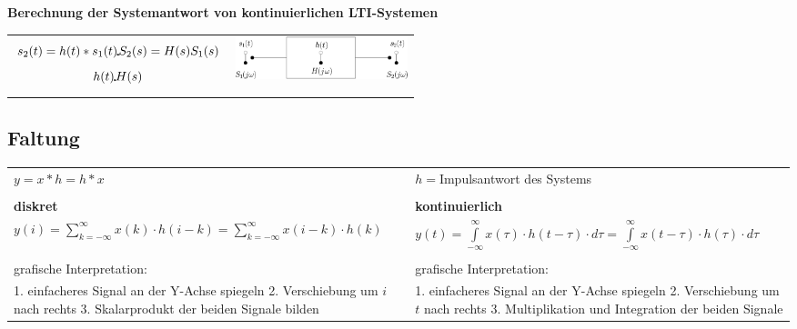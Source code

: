 		\textbf{Berechnung der Systemantwort von kontinuierlichen LTI-Systemen}\\
		\begin{tabular}{ll}
			\parbox{8cm}{
			$$s_2(t) = h(t) * s_1(t) \FT S_2(s) = H(s) S_1(s)$$
			$$h(t) \FT H(s)$$}
			& \parbox{8cm}{
			\includegraphics[width=5cm]{./bilder/utf-theorie.png}}\\
		\end{tabular}	
		
	\subsection{Faltung}
		\begin{tabular}{ll}
	        $\boxed{y=x*h=h*x}$&$h=$Impulsantwort des Systems\\ & \\
	   		\textbf{diskret}& \textbf{kontinuierlich}\\
	   		$\boxed{y(i)=\sum\limits_{k=-\infty}^{\infty}x(k)\cdot
	   		h(i-k)=\sum\limits_{k=-\infty}^{\infty}x(i-k)\cdot h(k)}$&
	   		$\boxed{y(t)=\int\limits_{-\infty}^{\infty}x(\tau)\cdot
	   		h(t-\tau)\cdot d\tau=\int\limits_{-\infty}^{\infty}x(t-\tau)\cdot
	   		h(\tau)\cdot d\tau}$\\ & \\
	   		grafische Interpretation: & grafische Interpretation:\\
	   		\parbox{8cm}{1. einfacheres Signal an der Y-Achse spiegeln\\
	   					2. Verschiebung um  $i$ nach rechts\\
	   					3. Skalarprodukt der beiden Signale bilden}&
			\parbox{8cm}{1. einfacheres Signal an der Y-Achse spiegeln\\
			 			2. Verschiebung um $t$ nach rechts\\
			 			3. Multiplikation und Integration der beiden Signale}		
        \end{tabular}
	